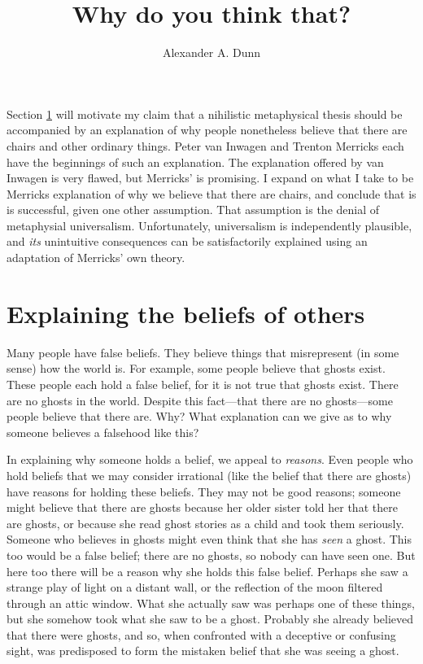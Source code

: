 \documentclass[11pt]{article}
\title{Why do you think that?}
\author{Alexander A. Dunn}
\begin{document}
\ifstandalone
\maketitle
\begin{spacing}{1.5}
\fi
\label{stroud}

\noindent Section \ref{intro-beliefs} will motivate my claim that a
nihilistic metaphysical thesis should be accompanied by an explanation
of why people nonetheless believe that there are chairs and other
ordinary things.  Peter van Inwagen and Trenton Merricks each have the
beginnings of such an explanation.  The explanation offered by van
Inwagen is very flawed, but Merricks' is promising.  I expand on what
I take to be Merricks explanation of why we believe that there are
chairs, and conclude that is is successful, given one other
assumption.  That assumption is the denial of metaphysial
universalism.  Unfortunately, universalism is independently plausible,
and {\em its} unintuitive consequences can be satisfactorily explained
using an adaptation of Merricks' own theory.

\section{Explaining the beliefs of others}
\label{intro-beliefs}
\noindent Many people have false beliefs.  They believe things that
misrepresent (in some sense) how the world is.  For example, some
people believe that ghosts exist.  These people each hold a false
belief, for it is not true that ghosts exist.  There are no ghosts in
the world.  Despite this fact---that there are no ghosts---some people
believe that there are.  Why?  What explanation can we give as to why
someone believes a falsehood like this?

In explaining why someone holds a belief, we appeal to {\em reasons}.
Even people who hold beliefs that we may consider irrational (like the
belief that there are ghosts) have reasons for holding these beliefs.
They may not be good reasons; someone might believe that there are
ghosts because her older sister told her that there are ghosts, or
because she read ghost stories as a child and took them seriously.
Someone who believes in ghosts might even think that she has {\em
  seen} a ghost.  This too would be a false belief; there are no
ghosts, so nobody can have seen one.  But here too there will be a
reason why she holds this false belief.  Perhaps she saw a strange
play of light on a distant wall, or the reflection of the moon
filtered through an attic window.  What she actually saw was perhaps
one of these things, but she somehow took what she saw to be a ghost.
Probably she already believed that there were ghosts, and so, when
confronted with a deceptive or confusing sight, was predisposed to
form the mistaken belief that she was seeing a ghost.


\end{spacing}
\end{document}
